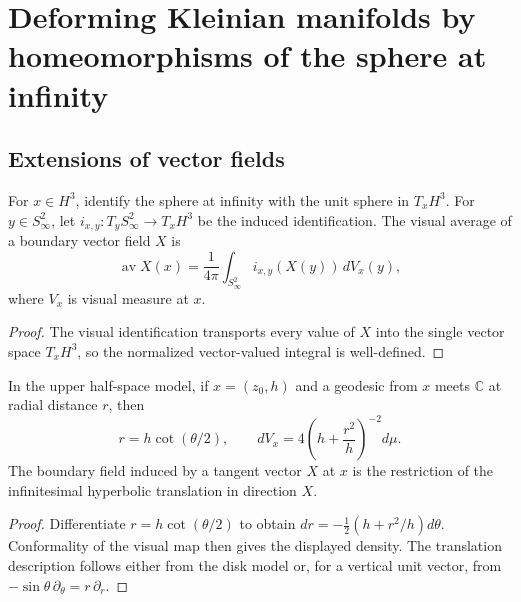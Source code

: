 \chapter{Deforming Kleinian manifolds by homeomorphisms of the sphere at infinity}

\section{Extensions of vector fields}

\begin{definition}
\label{thurston-ch11-visual-average}

For $x\in H^3$, identify the sphere at infinity with the unit sphere in
$T_xH^3$.  For $y\in S^2_\infty$, let
$i_{x,y}:T_yS^2_\infty\to T_xH^3$ be the induced identification.  The visual
average of a boundary vector field $X$ is
\[
 \operatorname{av}X(x)=\frac{1}{4\pi}
 \int_{S^2_\infty}i_{x,y}(X(y))\,dV_x(y),
\]
where $V_x$ is visual measure at $x$.
\end{definition}
\begin{proof}
\sketch The visual identification transports every value of $X$ into the
single vector space $T_xH^3$, so the normalized vector-valued integral is
well-defined.
\end{proof}

\begin{lemma}
\label{thurston-ch11-visual-measure}

In the upper half-space model, if $x=(z_0,h)$ and a geodesic from $x$ meets
$\mathbb C$ at radial distance $r$, then
\[
 r=h\cot(\theta/2),\qquad
 dV_x=4\left(h+\frac{r^2}{h}\right)^{-2}d\mu.
\]
The boundary field induced by a tangent vector $X$ at $x$ is the restriction
of the infinitesimal hyperbolic translation in direction $X$.
\end{lemma}
\begin{proof}
\sketch Differentiate $r=h\cot(\theta/2)$ to obtain
$dr=-\frac12(h+r^2/h)d\theta$.  Conformality of the visual map then gives
the displayed density.  The translation description follows either from the
disk model or, for a vertical unit vector, from
$-\sin\theta\,\partial_\theta=r\,\partial_r$.
\end{proof}

